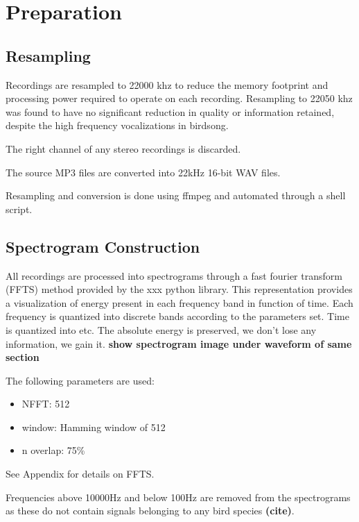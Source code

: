 \section{Preparation}\label{sec:prep}
\subsection{Resampling}
Recordings are resampled to 22000 khz to reduce the memory footprint and
processing power required to operate on each recording.
Resampling to 22050 khz was found to have no significant reduction in quality
or information retained, despite the high frequency vocalizations in birdsong.

The right channel of any stereo recordings is discarded.

The source MP3 files are converted into 22kHz 16-bit WAV files.

Resampling and conversion is done using ffmpeg and automated through a shell
script.


\subsection{Spectrogram Construction}
All recordings are processed into spectrograms through a fast fourier transform
(FFTS) method provided by the xxx python library.
This representation provides a visualization of energy present in each frequency
band in function of time.
Each frequency is quantized into discrete bands according to the parameters set.
Time is quantized into etc.
The absolute energy is preserved, we don't lose any information, we gain it.
\textbf{show spectrogram image under waveform of same section}

The following parameters are used:
\begin{itemize}
  \item NFFT: 512
  \item window: Hamming window of 512
  \item n overlap: 75\%
\end{itemize}

See Appendix for details on FFTS.

Frequencies above 10000Hz and below 100Hz are removed from the spectrograms as these do
not contain signals belonging to any bird species \textbf{(cite)}.
